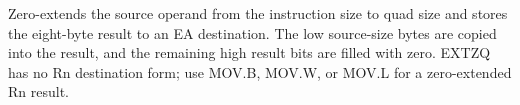 Zero-extends the source operand from the instruction size to quad size and stores the eight-byte result to an EA destination. The low source-size bytes are copied into the result, and the remaining high result bits are filled with zero. EXTZQ has no Rn destination form; use MOV.B, MOV.W, or MOV.L for a zero-extended Rn result.
